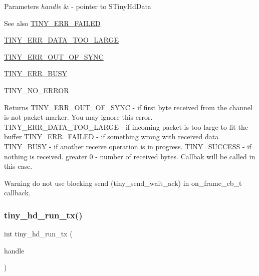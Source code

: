 \begin{DoxyParams}{Parameters}
{\em handle} & -\/ pointer to S\+Tiny\+Hd\+Data \\
\hline
\end{DoxyParams}
\begin{DoxySeeAlso}{See also}
\hyperlink{group__ERROR__FLAGS_ga84e6ca143550038e1a71cf36078d1926}{T\+I\+N\+Y\+\_\+\+E\+R\+R\+\_\+\+F\+A\+I\+L\+ED} 

\hyperlink{group__ERROR__FLAGS_ga7bbe7440d11ad304b0af68e011f4eab7}{T\+I\+N\+Y\+\_\+\+E\+R\+R\+\_\+\+D\+A\+T\+A\+\_\+\+T\+O\+O\+\_\+\+L\+A\+R\+GE} 

\hyperlink{group__ERROR__FLAGS_gae1949de45d9c478830dad9c9b996193a}{T\+I\+N\+Y\+\_\+\+E\+R\+R\+\_\+\+O\+U\+T\+\_\+\+O\+F\+\_\+\+S\+Y\+NC} 

\hyperlink{group__ERROR__FLAGS_ga9b3e170e1c6ce269f216ef4a1ac61995}{T\+I\+N\+Y\+\_\+\+E\+R\+R\+\_\+\+B\+U\+SY} 

T\+I\+N\+Y\+\_\+\+N\+O\+\_\+\+E\+R\+R\+OR 
\end{DoxySeeAlso}
\begin{DoxyReturn}{Returns}
T\+I\+N\+Y\+\_\+\+E\+R\+R\+\_\+\+O\+U\+T\+\_\+\+O\+F\+\_\+\+S\+Y\+NC -\/ if first byte received from the channel is not packet marker. You may ignore this error. T\+I\+N\+Y\+\_\+\+E\+R\+R\+\_\+\+D\+A\+T\+A\+\_\+\+T\+O\+O\+\_\+\+L\+A\+R\+GE -\/ if incoming packet is too large to fit the buffer T\+I\+N\+Y\+\_\+\+E\+R\+R\+\_\+\+F\+A\+I\+L\+ED -\/ if something wrong with received data T\+I\+N\+Y\+\_\+\+B\+U\+SY -\/ if another receive operation is in progress. T\+I\+N\+Y\+\_\+\+S\+U\+C\+C\+E\+SS -\/ if nothing is received. greater 0 -\/ number of received bytes. Callbak will be called in this case. 
\end{DoxyReturn}
\begin{DoxyWarning}{Warning}
do not use blocking send (tiny\+\_\+send\+\_\+wait\+\_\+ack) in on\+\_\+frame\+\_\+cb\+\_\+t callback. 
\end{DoxyWarning}
\mbox{\label{group__HALF__DUPLEX__API_ga84325cc961c3f31e2ba6111d0235bd61}} 
\subsubsection{\texorpdfstring{tiny\+\_\+hd\+\_\+run\+\_\+tx()}{tiny\_hd\_run\_tx()}}
{\footnotesize\ttfamily int tiny\+\_\+hd\+\_\+run\+\_\+tx (\begin{DoxyParamCaption}\item[{\hyperlink{tiny__hd_8h_af9f81ad129b754a780dfca5dcd7f7cf9}{S\+Tiny\+Hd\+Data} $\ast$}]{handle }\end{DoxyParamCaption})}

